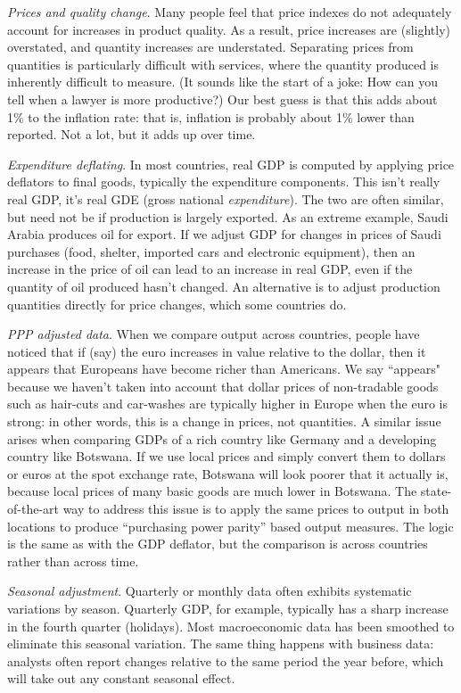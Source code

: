 \documentclass[12pt,letterpaper]{article}
\begin{document}
{\it Prices and quality change\/}. Many people feel that price
indexes do not adequately account for increases in product
quality. As a result, price increases are (slightly) overstated,
and quantity increases are understated.
Separating prices from quantities is particularly
difficult with services, where the quantity produced is inherently
difficult to measure. (It sounds like the start of a joke:  How
can you tell when a lawyer is more productive?)  Our best guess is
that this adds about 1\% to the inflation rate:  that is,
inflation is probably about 1\% lower than reported.
Not a lot, but it adds up over time.

{\it Expenditure deflating\/}.
In most countries, real GDP is computed by
applying price deflators to final goods, typically the expenditure components.
This isn't really real GDP, it's real GDE (gross national {\it expenditure\/}).  The two are often similar, but need not be if production is largely exported.
As an extreme example, Saudi Arabia produces oil for export.
If we adjust GDP for changes in prices of Saudi purchases
(food, shelter, imported cars and electronic equipment),
then an increase in the price of oil can lead to an increase in real GDP,
even if the quantity of oil produced hasn't changed.
An alternative is to adjust production quantities directly for price changes,
which some countries do.

{\it PPP adjusted data\/}. %
When we compare output across countries, people have noticed that
if (say) the euro increases in value relative to the dollar, then
it appears that Europeans have become richer than Americans. We
say ``appears" because we haven't taken into account that dollar
prices of non-tradable goods such as hair-cuts and car-washes are
typically higher in Europe when the euro is strong:  in other
words, this is a change in prices, not quantities. A similar issue
arises when comparing GDPs of a rich country like Germany and a
developing country like Botswana. If we use local prices and
simply convert them to dollars or euros at the spot exchange rate,
Botswana will look poorer that it actually is, because local
prices of many basic goods are much lower in Botswana. The
state-of-the-art way to address this issue is to apply the same
prices to output in both locations to produce ``purchasing power
parity'' based output measures. The logic is the same as with the
GDP deflator, but the comparison is across countries rather
than across time.


{\it Seasonal adjustment\/}.
Quarterly or monthly data often exhibits systematic variations by season.
Quarterly GDP, for example, typically has a sharp increase in the fourth quarter
(holidays).
Most macroeconomic data has been smoothed to eliminate this seasonal variation.
The same thing happens with business data:
analysts often report changes relative to the same period the year before,
which will take out any constant seasonal effect.
\end{document}
